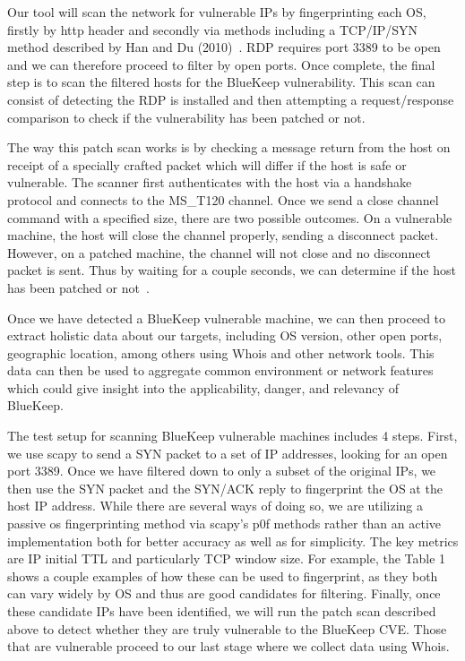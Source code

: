 Our tool will scan the network for vulnerable IPs by fingerprinting each OS, firstly by http header and secondly via methods including a TCP/IP/SYN method described by Han and Du (2010)~\cite{han_du_2010}. RDP requires port 3389 to be open and we can therefore proceed to filter by open ports. Once complete, the final step is to scan the filtered hosts for the BlueKeep vulnerability. This scan can consist of detecting the RDP is installed and then attempting a request/response comparison to check if the vulnerability has been patched or not.

The way this patch scan works is by checking a message return from the host on receipt of a specially crafted packet which will differ if the host is safe or vulnerable. The scanner first authenticates with the host via a handshake protocol and connects to the MS\_T120 channel. Once we send a close channel command with a specified size, there are two possible outcomes. On a vulnerable machine, the host will close the channel properly, sending a disconnect packet. However, on a patched machine, the channel will not close and no disconnect packet is sent. Thus by waiting for a couple seconds, we can determine if the host has been patched or not~\cite{dillon_2019}.

Once we have detected a BlueKeep vulnerable machine, we can then proceed to extract holistic data about our targets, including OS version, other open ports, geographic location, among others using Whois and other network tools. This data can then be used to aggregate common environment or network features which could give insight into the applicability, danger, and relevancy of BlueKeep.

The test setup for scanning BlueKeep vulnerable machines includes 4 steps. First, we use scapy to send a SYN packet to a set of IP addresses, looking for an open port 3389. Once we have filtered down to only a subset of the original IPs, we then use the SYN packet and the SYN/ACK reply to fingerprint the OS at the host IP address. While there are several ways of doing so, we are utilizing a passive os fingerprinting method via scapy's p0f methods rather than an active implementation both for better accuracy as well as for simplicity. The key metrics are IP initial TTL and particularly TCP window size. For example, the Table 1 shows a couple examples of how these can be used to fingerprint, as they both can vary widely by OS and thus are good candidates for filtering. Finally, once these candidate IPs have been identified, we will run the patch scan described above to detect whether they are truly vulnerable to the BlueKeep CVE. Those that are vulnerable proceed to our last stage where we collect data using Whois.